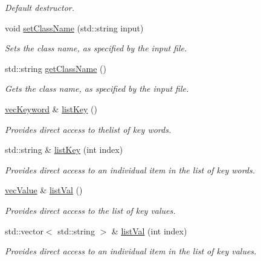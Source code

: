 \begin{DoxyCompactItemize}
\begin{DoxyCompactList}\small\item\em Default destructor. \end{DoxyCompactList}\item 
void \hyperlink{classosea_1_1_object_group_afe112da71222da5ed206dc81636b3ca7}{set\-Class\-Name} (std\-::string input)
\begin{DoxyCompactList}\small\item\em Sets the class name, as specified by the input file. \end{DoxyCompactList}\item 
std\-::string \hyperlink{classosea_1_1_object_group_aa158e9516621ab6e2b690bad6c6619b5}{get\-Class\-Name} ()
\begin{DoxyCompactList}\small\item\em Gets the class name, as specified by the input file. \end{DoxyCompactList}\item 
\hyperlink{namespaceosea_a752ba1895c2932eda28076a8a467ae37}{vec\-Keyword} \& \hyperlink{classosea_1_1_object_group_a0f44d28c868ba60971af1a7aceb2e5bd}{list\-Key} ()
\begin{DoxyCompactList}\small\item\em Provides direct access to thelist of key words. \end{DoxyCompactList}\item 
std\-::string \& \hyperlink{classosea_1_1_object_group_a4b52a556b4404a1d13d50d0a3808eec2}{list\-Key} (int index)
\begin{DoxyCompactList}\small\item\em Provides direct access to an individual item in the list of key words. \end{DoxyCompactList}\item 
\hyperlink{namespaceosea_a32445ae8bddcf230ef3a16926ffd0f98}{vec\-Value} \& \hyperlink{classosea_1_1_object_group_a6c3064de310a852551d438a5f31f987f}{list\-Val} ()
\begin{DoxyCompactList}\small\item\em Provides direct access to the list of key values. \end{DoxyCompactList}\item 
std\-::vector$<$ std\-::string $>$ \& \hyperlink{classosea_1_1_object_group_af23637baa7d1b46b34dcb5e5de4b68bd}{list\-Val} (int index)
\begin{DoxyCompactList}\small\item\em Provides direct access to an individual item in the list of key values. \end{DoxyCompactList}\item 

\end{DoxyCompactItemize}
